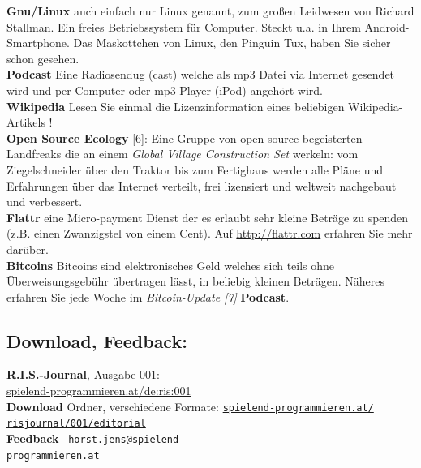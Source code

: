 \textbf{Gnu/Linux} auch einfach nur Linux genannt, zum großen Leidwesen von Richard Stallman. Ein freies Betriebssystem für Computer. Steckt u.a. in Ihrem Android-Smartphone. Das Maskottchen von Linux, den Pinguin Tux, haben Sie sicher schon gesehen. \\

\textbf{Podcast} Eine Radiosendug (cast) welche als mp3 Datei via Internet gesendet wird und per Computer oder mp3-Player (iPod) angehört wird. \\

\textbf{Wikipedia} Lesen Sie einmal die Lizenzinformation eines beliebigen Wikipedia-Artikels ! \\

\href{http://opensourceecology.org/}{\textbf{Open Source Ecology}} [6]: Eine Gruppe von open-source begeisterten  Landfreaks die an einem \textit{Global Village Construction Set} werkeln: vom Ziegelschneider über den Traktor bis zum Fertighaus werden alle Pläne und Erfahrungen über das Internet verteilt, frei lizensiert und weltweit nachgebaut und verbessert.\\

\textbf{Flattr} eine Micro-payment Dienst der es erlaubt sehr kleine Beträge  zu spenden (z.B. einen Zwanzigstel von einem Cent). Auf \url{http://flattr.com} erfahren Sie mehr darüber.\\

\textbf{Bitcoins} Bitcoins sind elektronisches Geld welches sich teils ohne Überweisungsgebühr übertragen lässt, in beliebig kleinen Beträgen. Näheres erfahren Sie jede Woche im \href{http://www.bitcoinupdate.com/}{\textit{Bitcoin-Update [7]}} \textbf{Podcast}.

\subsection*{Download, Feedback:}
\textbf{R.I.S.-Journal}, Ausgabe 001: \\
\href{http://spielend-programmieren.at/de:ris:001}{spielend-programmieren.at/de:ris:001}\\
\textbf{Download} Ordner, verschiedene Formate: \href{http://spielend-programmieren.at/risjournal/001/editorial}{\texttt{spielend-programmieren.at/\\risjournal/001/editorial}} \\
\textbf{Feedback} \Letter\ \texttt{horst.jens@spielend-\\programmieren.at} \\



